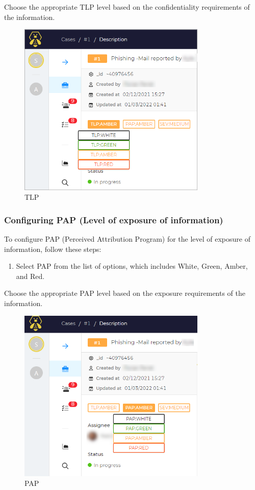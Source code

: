 \documentclass{article}
\begin{document}
Choose the appropriate TLP level based on the confidentiality requirements of the information.

\begin{figure}[H]
    \centering
    \includegraphics[width=0.8\textwidth]{configure1.png}
    \caption{TLP}
    \label{fig:tlp}
\end{figure}

\subsubsection*{Configuring PAP (Level of exposure of information)}

To configure PAP (Perceived Attribution Program) for the level of exposure of information, follow these steps:

\begin{enumerate}
  \item Select PAP from the list of options, which includes White, Green, Amber, and Red.
\end{enumerate}

Choose the appropriate PAP level based on the exposure requirements of the information.

\begin{figure}[H]
    \centering
    \includegraphics[width=0.8\textwidth]{configure2.png}
    \caption{PAP}
    \label{fig:pap}
\end{figure}
\end{document}
